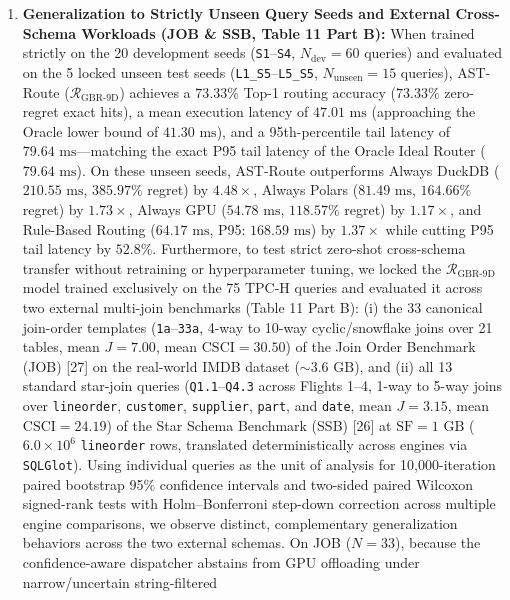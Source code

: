 \documentclass[10pt,a4paper]{article}
\begin{document}
\begin{enumerate}[leftmargin=1.5em,itemsep=2pt]
confidence-aware routing reduces the probability of selecting a slower engine ($P_{\text{subopt}} = 1 - \text{Zero-Regret Hit Rate}$) from $46.67\%$ ($35/75$) under point-estimate $\arg\min$ to $41.33\%$ ($31/75$), lowers expected latency regret from $48.12\%$ ($58.64\text{ ms}$) to $34.98\%$ ($54.92\text{ ms}$), cuts P95 tail regret from $164.80\%$ to $114.11\%$, reduces worst-case (maximum) regret from $312.40\%$ to $245.18\%$ (vs.\ $620.63\%$ on Always GPU), more than halves the high-regret failure rate ($\mathcal{R}_{\text{regret}} > 100\%$) from $14.67\%$ ($11/75$) to $6.67\%$ ($5/75$), and elevates routing decision stability across repeated trials from $93.33\%$ to $98.67\%$.
    \item \textbf{Generalization to Strictly Unseen Query Seeds and External Cross-Schema Workloads (JOB \& SSB, Table 11 Part B):} When trained strictly on the 20 development seeds (\texttt{S1}--\texttt{S4}, $N_{\text{dev}}=60$ queries) and evaluated on the 5 locked unseen test seeds (\texttt{L1\_S5}--\texttt{L5\_S5}, $N_{\text{unseen}}=15$ queries), AST-Route ($\mathcal{R}_{\text{GBR-9D}}$) achieves a $73.33\%$ Top-1 routing accuracy ($73.33\%$ zero-regret exact hits), a mean execution latency of $47.01\text{ ms}$ (approaching the Oracle lower bound of $41.30\text{ ms}$), and a 95th-percentile tail latency of $79.64\text{ ms}$---matching the exact P95 tail latency of the Oracle Ideal Router ($79.64\text{ ms}$). On these unseen seeds, AST-Route outperforms Always DuckDB ($210.55\text{ ms}$, $385.97\%$ regret) by $4.48\times$, Always Polars ($81.49\text{ ms}$, $164.66\%$ regret) by $1.73\times$, Always GPU ($54.78\text{ ms}$, $118.57\%$ regret) by $1.17\times$, and Rule-Based Routing ($64.17\text{ ms}$, P95: $168.59\text{ ms}$) by $1.37\times$ while cutting P95 tail latency by $52.8\%$. Furthermore, to test strict zero-shot cross-schema transfer without retraining or hyperparameter tuning, we locked the $\mathcal{R}_{\text{GBR-9D}}$ model trained exclusively on the 75 TPC-H queries and evaluated it across two external multi-join benchmarks (Table 11 Part B): (i) the 33 canonical join-order templates (\texttt{1a}--\texttt{33a}, 4-way to 10-way cyclic/snowflake joins over 21 tables, mean $J=7.00$, mean $\text{CSCI}=30.50$) of the Join Order Benchmark (JOB) [27] on the real-world IMDB dataset ($\sim 3.6\text{ GB}$), and (ii) all 13 standard star-join queries (\texttt{Q1.1}--\texttt{Q4.3} across Flights 1--4, 1-way to 5-way joins over \texttt{lineorder}, \texttt{customer}, \texttt{supplier}, \texttt{part}, and \texttt{date}, mean $J=3.15$, mean $\text{CSCI}=24.19$) of the Star Schema Benchmark (SSB) [26] at $\text{SF}=1\text{ GB}$ ($6.0\times 10^6$ \texttt{lineorder} rows, translated deterministically across engines via \texttt{SQLGlot}). Using individual queries as the unit of analysis for 10,000-iteration paired bootstrap 95\% confidence intervals and two-sided paired Wilcoxon signed-rank tests with Holm--Bonferroni step-down correction across multiple engine comparisons, we observe distinct, complementary generalization behaviors across the two external schemas. On JOB ($N=33$), because the confidence-aware dispatcher abstains from GPU offloading under narrow/uncertain string-filtered 
\end{enumerate}
\end{document}
